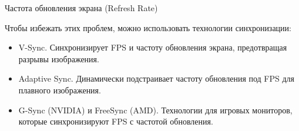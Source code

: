 \documentclass{beamer}
\begin{document}
\begin{frame}{Частота обновления экрана (Refresh Rate)}
{			\footnotesize
			Чтобы избежать этих проблем, можно использовать технологии синхронизации:
			
			\begin{itemize}
				\item 
				V-Sync. 
				Синхронизирует FPS и частоту обновления экрана, предотвращая разрывы изображения.
				\item
				Adaptive Sync. 
				Динамически подстраивает частоту обновления под FPS для плавного изображения.
				\item
				G-Sync (NVIDIA) и FreeSync (AMD). 
				Технологии для игровых мониторов, которые синхронизируют FPS с частотой обновления.
			\end{itemize}
			
			
		}

	\end{frame}
	
\end{document}
